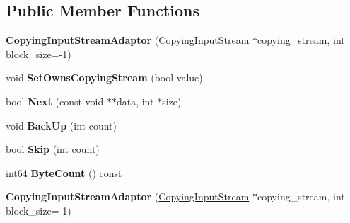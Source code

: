 \subsection*{Public Member Functions}
\begin{DoxyCompactItemize}
\item 
\mbox{\label{classgoogle_1_1protobuf_1_1io_1_1CopyingInputStreamAdaptor_aa1784a3c16fc39b3f311d8b892233212}} 
{\bfseries Copying\+Input\+Stream\+Adaptor} (\hyperlink{classgoogle_1_1protobuf_1_1io_1_1CopyingInputStream}{Copying\+Input\+Stream} $\ast$copying\+\_\+stream, int block\+\_\+size=-\/1)
\item 
\mbox{\label{classgoogle_1_1protobuf_1_1io_1_1CopyingInputStreamAdaptor_af6af293424bbadd3aeb9218edfdf9e93}} 
void {\bfseries Set\+Owns\+Copying\+Stream} (bool value)
\item 
\mbox{\label{classgoogle_1_1protobuf_1_1io_1_1CopyingInputStreamAdaptor_a880320eeb574a440251c3047ccd11d71}} 
bool {\bfseries Next} (const void $\ast$$\ast$data, int $\ast$size)
\item 
\mbox{\label{classgoogle_1_1protobuf_1_1io_1_1CopyingInputStreamAdaptor_a9e7f1e28fc210ea4797edb6cd6c6bc90}} 
void {\bfseries Back\+Up} (int count)
\item 
\mbox{\label{classgoogle_1_1protobuf_1_1io_1_1CopyingInputStreamAdaptor_a836f58552bbdd0a4ad41c9057443e574}} 
bool {\bfseries Skip} (int count)
\item 
\mbox{\label{classgoogle_1_1protobuf_1_1io_1_1CopyingInputStreamAdaptor_a7954037f760aa7b3b371523a88af3fc2}} 
int64 {\bfseries Byte\+Count} () const
\item 
\mbox{\label{classgoogle_1_1protobuf_1_1io_1_1CopyingInputStreamAdaptor_aa1784a3c16fc39b3f311d8b892233212}} 
{\bfseries Copying\+Input\+Stream\+Adaptor} (\hyperlink{classgoogle_1_1protobuf_1_1io_1_1CopyingInputStream}{Copying\+Input\+Stream} $\ast$copying\+\_\+stream, int block\+\_\+size=-\/1)
$$
\end{DoxyCompactItemize}
